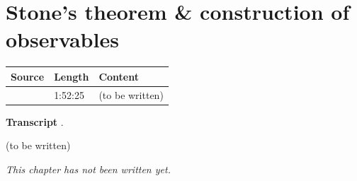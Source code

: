 \chapter{Stone's theorem \& construction of observables}\label{ch:c32}
\begin{paracol}{2}

\begin{sources}
\begin{tabularx}{\linewidth}{@{}l l L@{}}
\toprule
\textbf{Source} & \textbf{Length} & \textbf{Content}\\
\midrule
{} & 1:52:25 & (to be written)\\
\bottomrule
\end{tabularx}

\smallskip
\textbf{Transcript} .
\end{sources}

\begin{reading}
(to be written)
\end{reading}

\emph{This chapter has not been written yet.}

\flushside
\end{paracol}
